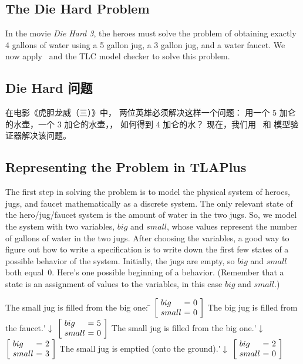 
\begin{en}
\newpage
\vspace{-\baselineskip}%

\section{The Die Hard Problem} 

In the movie \emph{Die Hard 3}, the heroes must solve the problem of
obtaining exactly 4 gallons of water using a 5 gallon jug, a 3 gallon
jug, and a water faucet.  We now apply \tlaplus\ and the TLC
model checker to solve this problem.
\end{en}

\begin{ch}
\newpage
\vspace{-\baselineskip}%

\section{Die Hard 问题} 

在电影《虎胆龙威（三）》中，
两位英雄必须解决这样一个问题：
用一个 5 加仑的水壶，一个 3 加仑的水壶，，
如何得到 4 加仑的水？
现在，我们用 \tlaplus\ 和 \tlc{} 模型验证器解决该问题。
\end{ch}

\begin{en}
\subsection{Representing the Problem in TLAPlus}%

The first step in solving the problem is to model the physical system
of heroes, jugs, and faucet mathematically as a discrete system.
%
The only relevant state of the hero/jug/faucet system is the amount of
water in the two jugs.  So, we model the system with two variables,
$big$ and $small$, whose values represent the number of gallons of
water in the two jugs.  After choosing the variables, a good way to
figure out how to write a specification is to write down the first few
states of a possible behavior of the system.  Initially, the jugs are
empty, so $big$ and $small$ both equal~0.  Here's one possible
beginning of a behavior.  (Remember that a state is an assignment of
values to the variables, in this case $big$ and $small$.)
\begin{display}
\begin{tabbing}
The small jug is filled from the big one: \= \kill
%
\>
$\dhstate{0}{0}$
%
\>The big jug is filled from the faucet.\'$\downarrow$
%
\>
$\dhstate{5}{0}$ 
%
%
\>The small jug is filled from the big one.\'$\downarrow$
%
\>
$\dhstate{2}{3}$
%
\>The small jug is emptied (onto the ground).\'$\downarrow$
%
\> $\dhstate{2}{0}$
\end{tabbing}
\end{display}
\end{en}

